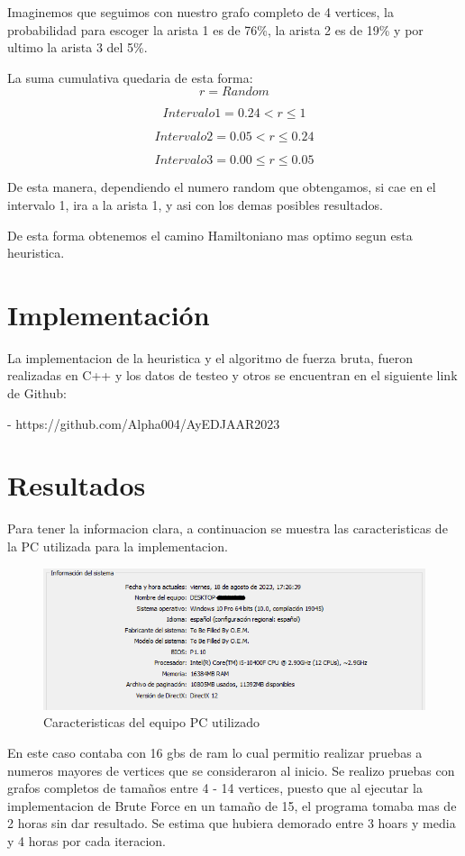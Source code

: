 \documentclass[12pt]{article}
\begin{document}
Imaginemos que seguimos con nuestro grafo completo de 4 vertices, la probabilidad para escoger la arista 1 es de 76\%, la arista 2 es de 19\% y por ultimo
la arista 3 del 5\%.

La suma cumulativa quedaria de esta forma:
\vspace{15mm}
$$\textit{r} = Random$$

$$Intervalo 1 = {0.24 < \textit{r} \leq 1 }$$

$$Intervalo 2 = {0.05 < \textit{r} \leq 0.24 }$$

$$Intervalo 3 = {0.00 \leq \textit{r} \leq 0.05 }$$

De esta manera, dependiendo el numero random que obtengamos, si cae en el intervalo 1, ira a la arista 1, y asi con los demas posibles resultados.

De esta forma obtenemos el camino Hamiltoniano mas optimo segun esta heuristica.

\section{Implementación}
La implementacion de la heuristica y el algoritmo de fuerza bruta, fueron realizadas en C++ y los datos de testeo y otros
se encuentran en el siguiente link de Github:

- https://github.com/Alpha004/AyEDJAAR2023

\section{Resultados}

Para tener la informacion clara, a continuacion se muestra las caracteristicas de la PC utilizada para la implementacion.

\begin{figure}[H]
\centering
\includegraphics[width=\textwidth]{caracteristicas}
\caption{Caracteristicas del equipo PC utilizado}
\end{figure}

En este caso contaba con 16 gbs de ram lo cual permitio realizar pruebas a numeros mayores de vertices que se consideraron al inicio.
Se realizo pruebas con grafos completos de tamaños entre 4 - 14 vertices, puesto que al ejecutar la implementacion de Brute Force 
en un tamaño de 15, el programa tomaba mas de 2 horas sin dar resultado. Se estima que hubiera demorado entre 3 hoars y media y 4 horas
por cada iteracion.
\end{document}
